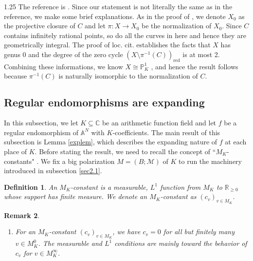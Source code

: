\documentclass[12pt]{article}
\newtheorem{definition}{Definition}[section]
\newtheorem{remark}[definition]{Remark}
\begin{document}
\begin{spacing}{1.25}
The reference is \cite[Corollary 4.11]{Voj21}. Since our statement is not literally the same as in the reference, we make some brief explanations. As in the proof of \cite[Corollary 4.11]{Voj21}, we denote $X_0$ as the projective closure of $C$ and let $\pi\colon X\to X_0$ be the normalization of $X_0$. Since $C$ contains infinitely rational points, so do all the curves in here and hence they are geometrically integral. The proof of loc. cit. establishes the facts that $X$ has genus 0 and the degree of the zero cycle $(X\setminus\pi^{-1}(C))_{\mathrm{red}}$ is at most 2. Combining these informations, we know $X\cong\mathbb{P}_K^1$ \cite[Proposition 53.10.4 (0C6U)]{Stacks}, and hence the result follows because $\pi^{-1}(C)$ is naturally isomorphic to the normalization of $C$.















\subsection{Regular endomorphisms are expanding}\label{expand}

In this subsection, we let $K\subseteq\mathbb{C}$ be an arithmetic function field and let $f$ be a regular endomorphism of $\mathbb{A}^N$ with $K$-coefficients. The main result of this subsection is Lemma \ref{explem}, which describes the expanding nature of $f$ at each place of $K$. Before stating the result, we need to recall the concept of ``$M_K$-constants" \cite[Definition 3.18]{Voj21}. We fix a big polarization $M=(B;\mathcal{M})$ of $K$ to run the machinery introduced in subsection \ref{sec2.1}.

\begin{definition}\label{MKconst}
An $M_K$-\emph{constant} is a measurable, $L^1$ function from $M_K$ to $\mathbb{R}_{\geq0}$ whose support has finite measure. We denote an $M_K$-constant as $(c_v)_{v\in M_K}$.
\end{definition}

\begin{remark}\label{MKconstrmk}
\begin{enumerate}
\item
For an $M_K$-constant $(c_v)_{v\in M_K}$, we have $c_v=0$ for all but finitely many $v\in M_K^0$. The measurable and $L^1$ conditions are mainly toward the behavior of $c_v$ for $v\in M_{K}^{\infty}$.
 

\end{enumerate}
\end{remark}
\end{spacing}
\end{document}

